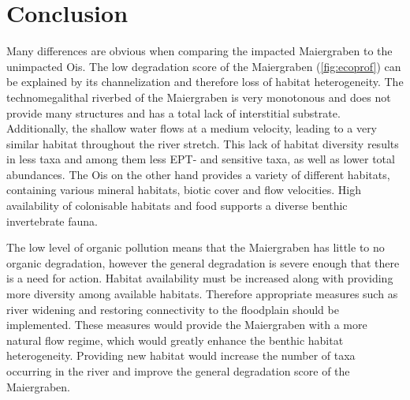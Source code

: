 

\section{Conclusion}\label{sec:conclusion}                                                   %

Many differences are obvious when comparing the impacted Maiergraben to the unimpacted Ois. The low degradation score of the Maiergraben (\cref{fig:ecoprof}) can be explained by its channelization and therefore loss of habitat heterogeneity. The technomegalithal riverbed of the Maiergraben is very monotonous and does not provide many structures and has a total lack of interstitial substrate. Additionally, the shallow water flows at a medium velocity, leading to a very similar habitat throughout the river stretch. This lack of habitat diversity results in less taxa and among them less EPT- and sensitive taxa, as well as lower total abundances. The Ois on the other hand provides a variety of different habitats, containing various mineral habitats, biotic cover and flow velocities. High availability of colonisable habitats and food supports a diverse benthic invertebrate fauna.


The low level of organic pollution means that the Maiergraben has little to no organic degradation, however the general degradation is severe enough that there is a need for action. Habitat availability must be increased along with providing more diversity among available habitats. Therefore appropriate measures such as river widening and restoring connectivity to the floodplain should be implemented. These measures would provide the Maiergraben with a more natural flow regime, which would greatly enhance the benthic habitat heterogeneity. Providing new habitat would increase the number of taxa occurring in the river and improve the general degradation score of the Maiergraben.